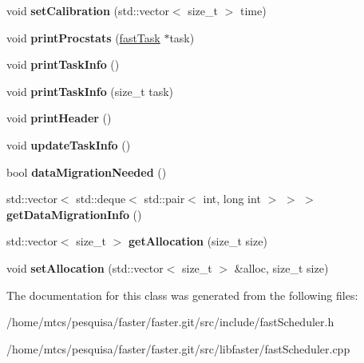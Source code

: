 \begin{DoxyCompactItemize}
\hypertarget{classfaster_1_1fastScheduler_a4d2aec030cd131b05c7091921545b3a4}{}\label{classfaster_1_1fastScheduler_a4d2aec030cd131b05c7091921545b3a4} 
void {\bfseries set\+Calibration} (std\+::vector$<$ size\+\_\+t $>$ time)
\item 
\hypertarget{classfaster_1_1fastScheduler_a17a44cb80cf026772647d5226ed56fcb}{}\label{classfaster_1_1fastScheduler_a17a44cb80cf026772647d5226ed56fcb} 
void {\bfseries print\+Procstats} (\hyperlink{classfaster_1_1fastTask}{fast\+Task} $\ast$task)
\item 
\hypertarget{classfaster_1_1fastScheduler_a426b97359b035f696ea99b0ce65ed781}{}\label{classfaster_1_1fastScheduler_a426b97359b035f696ea99b0ce65ed781} 
void {\bfseries print\+Task\+Info} ()
\item 
\hypertarget{classfaster_1_1fastScheduler_a93a5bb37ea8bc6a8d601dd01a2ed736b}{}\label{classfaster_1_1fastScheduler_a93a5bb37ea8bc6a8d601dd01a2ed736b} 
void {\bfseries print\+Task\+Info} (size\+\_\+t task)
\item 
\hypertarget{classfaster_1_1fastScheduler_a6c4b825db8c979eafead42e321e95d05}{}\label{classfaster_1_1fastScheduler_a6c4b825db8c979eafead42e321e95d05} 
void {\bfseries print\+Header} ()
\item 
\hypertarget{classfaster_1_1fastScheduler_a0c91feaec23646ee84e1fa530fe7cccf}{}\label{classfaster_1_1fastScheduler_a0c91feaec23646ee84e1fa530fe7cccf} 
void {\bfseries update\+Task\+Info} ()
\item 
\hypertarget{classfaster_1_1fastScheduler_a650ace70f7cb64835674cd67a5f605ca}{}\label{classfaster_1_1fastScheduler_a650ace70f7cb64835674cd67a5f605ca} 
bool {\bfseries data\+Migration\+Needed} ()
\item 
\hypertarget{classfaster_1_1fastScheduler_a181ea8d42d461ffd16785f77b4d6b416}{}\label{classfaster_1_1fastScheduler_a181ea8d42d461ffd16785f77b4d6b416} 
std\+::vector$<$ std\+::deque$<$ std\+::pair$<$ int, long int $>$ $>$ $>$ {\bfseries get\+Data\+Migration\+Info} ()
\item 
\hypertarget{classfaster_1_1fastScheduler_a47394267a9a85f9747a483a43cf6a650}{}\label{classfaster_1_1fastScheduler_a47394267a9a85f9747a483a43cf6a650} 
std\+::vector$<$ size\+\_\+t $>$ {\bfseries get\+Allocation} (size\+\_\+t size)
\item 
\hypertarget{classfaster_1_1fastScheduler_a6a691cada9432d0054a2dfefbe1fc9a3}{}\label{classfaster_1_1fastScheduler_a6a691cada9432d0054a2dfefbe1fc9a3} 
void {\bfseries set\+Allocation} (std\+::vector$<$ size\+\_\+t $>$ \&alloc, size\+\_\+t size)
\end{DoxyCompactItemize}


The documentation for this class was generated from the following files\+:\begin{DoxyCompactItemize}
\item 
/home/mtcs/pesquisa/faster/faster.\+git/src/include/fast\+Scheduler.\+h\item 
/home/mtcs/pesquisa/faster/faster.\+git/src/libfaster/fast\+Scheduler.\+cpp\end{DoxyCompactItemize}
